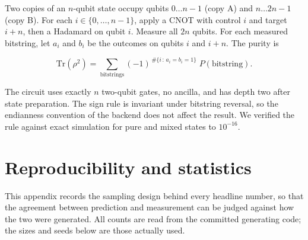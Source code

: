\documentclass[a4paper,superscriptaddress,nofootinbib,onecolumn,nopdfoutputerror]{quantumarticle}
\begin{document}
Two copies of an \(n\)-qubit state occupy qubits \(0 \ldots n-1\) (copy
A) and \(n \ldots 2n-1\) (copy B). For each
\(i \in \{0, \ldots, n-1\}\), apply a CNOT with control \(i\) and target
\(i+n\), then a Hadamard on qubit \(i\). Measure all \(2n\) qubits. For
each measured bitstring, let \(a_i\) and \(b_i\) be the outcomes on
qubits \(i\) and \(i+n\). The purity is

\[\mathrm{Tr}(\rho^2) = \sum_{\text{bitstrings}} (-1)^{\,\#\{i \,:\, a_i = b_i = 1\}} \; P(\text{bitstring}).\]

The circuit uses exactly \(n\) two-qubit gates, no ancilla, and has
depth two after state preparation. The sign rule is invariant under
bitstring reversal, so the endianness convention of the backend does not
affect the result. We verified the rule against exact simulation for
pure and mixed states to \(10^{-16}\).

\hypertarget{appendix-c.-reproducibility-and-statistics}{%
\section{Reproducibility and statistics}\label{appendix-c.-reproducibility-and-statistics}}

This appendix records the sampling design behind every headline number, so
that the agreement between prediction and measurement can be judged against
how the two were generated. All counts are read from the committed
generating code; the sizes and seeds below are those actually used.
\end{document}
